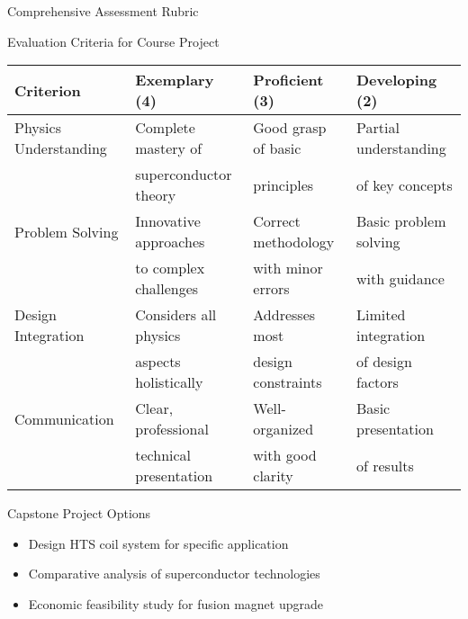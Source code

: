 \documentclass[aspectratio=169,xcolor={table,dvipsnames}]{beamer}
\begin{document}
\begin{frame}{Comprehensive Assessment Rubric}
    \begin{block}{Evaluation Criteria for Course Project}
        \small
        \begin{tabular}{|l|l|l|l|}
        \hline
        \textbf{Criterion} & \textbf{Exemplary (4)} & \textbf{Proficient (3)} & \textbf{Developing (2)} \\
        \hline
        Physics Understanding & Complete mastery of & Good grasp of basic & Partial understanding \\
        & superconductor theory & principles & of key concepts \\
        \hline
        Problem Solving & Innovative approaches & Correct methodology & Basic problem solving \\
        & to complex challenges & with minor errors & with guidance \\
        \hline
        Design Integration & Considers all physics & Addresses most & Limited integration \\
        & aspects holistically & design constraints & of design factors \\
        \hline
        Communication & Clear, professional & Well-organized & Basic presentation \\
        & technical presentation & with good clarity & of results \\
        \hline
        \end{tabular}
    \end{block}
    
    \begin{alertblock}{Capstone Project Options}
        \begin{itemize}
            \item Design HTS coil system for specific application
            \item Comparative analysis of superconductor technologies
            \item Economic feasibility study for fusion magnet upgrade
        \end{itemize}
    \end{alertblock}
\end{frame}
\end{document}
